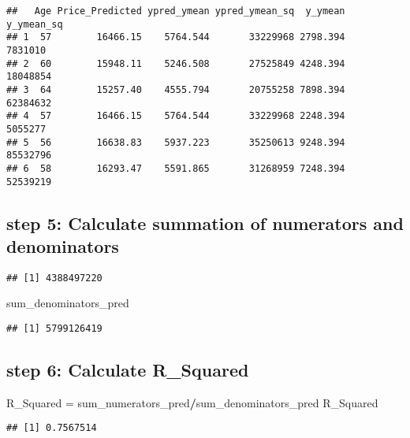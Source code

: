 \documentclass[]{article}
\newenvironment{Shaded}{\begin{snugshade}}{\end{snugshade}}
\newcommand{\KeywordTok}[1]{\textcolor[rgb]{0.13,0.29,0.53}{\textbf{#1}}}
\newcommand{\NormalTok}[1]{#1}
\newcommand{\OperatorTok}[1]{\textcolor[rgb]{0.81,0.36,0.00}{\textbf{#1}}}
\newcommand{\StringTok}[1]{\textcolor[rgb]{0.31,0.60,0.02}{#1}}
\begin{document}
\begin{verbatim}
##   Age Price_Predicted ypred_ymean ypred_ymean_sq  y_ymean y_ymean_sq
## 1  57        16466.15    5764.544       33229968 2798.394    7831010
## 2  60        15948.11    5246.508       27525849 4248.394   18048854
## 3  64        15257.40    4555.794       20755258 7898.394   62384632
## 4  57        16466.15    5764.544       33229968 2248.394    5055277
## 5  56        16638.83    5937.223       35250613 9248.394   85532796
## 6  58        16293.47    5591.865       31268959 7248.394   52539219
\end{verbatim}

\hypertarget{step-5-calculate-summation-of-numerators-and-denominators}{%
\subsection{step 5: Calculate summation of numerators and
denominators}\label{step-5-calculate-summation-of-numerators-and-denominators}}

\begin{Shaded}
\end{Shaded}

\begin{verbatim}
## [1] 4388497220
\end{verbatim}

\begin{Shaded}
\begin{Highlighting}[]
\NormalTok{sum_denominators_pred}
\end{Highlighting}
\end{Shaded}

\begin{verbatim}
## [1] 5799126419
\end{verbatim}

\hypertarget{step-6-calculate-r_squared}{%
\subsection{step 6: Calculate
R\_Squared}\label{step-6-calculate-r_squared}}

\begin{Shaded}
\begin{Highlighting}[]
\NormalTok{R_Squared =}\StringTok{ }\NormalTok{sum_numerators_pred}\OperatorTok{/}\NormalTok{sum_denominators_pred}
\NormalTok{R_Squared}
\end{Highlighting}
\end{Shaded}

\begin{verbatim}
## [1] 0.7567514
\end{verbatim}
\end{document}
